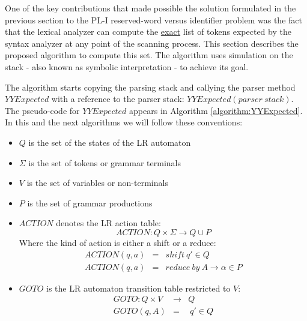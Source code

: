 One of the key contributions that made possible the 
solution formulated in the previous section to  the PL-I
reserved-word versus identifier problem was 
the fact that the lexical analyzer can 
compute the \underline{exact} list of tokens 
expected by the syntax analyzer at any point of the scanning process.
This section describes the proposed  algorithm 
to compute this set. 
The algorithm uses simulation on the stack -
also known as symbolic interpretation - to achieve its goal.

The algorithm starts copying the parsing stack and callying the 
parser method $YYExpected$ with a reference to the parser stack:
$YYExpected(parser\ stack)$.
The pseudo-code for $YYExpected$ appears in Algorithm
\ref{algorithm:YYExpected}. In this and the next algorithms 
we will follow these conventions:
\begin{itemize}
\item $Q$ is the set of the states of the LR automaton
\item $\Sigma$ is the set of tokens or grammar terminals
\item $V$ is the set of variables or non-terminals
\item $P$ is the set of grammar productions
\item $ACTION$ denotes the LR action table: 
\[ ACTION : Q \times \Sigma \rightarrow Q \cup P \]
Where the kind of action is either a shift or a reduce:
\begin{eqnarray*}
ACTION(q, a) &=& shift\ q' \in Q\\
ACTION(q, a) &=& reduce\ by\ A \rightarrow \alpha \in P
\end{eqnarray*}

\item $GOTO$ is the LR automaton transition table restricted
to $V$:
\begin{eqnarray*}
GOTO : Q \times V &\rightarrow& Q\\
GOTO(q, A) &=& \ q' \in Q\\
\end{eqnarray*}
\end{itemize}

